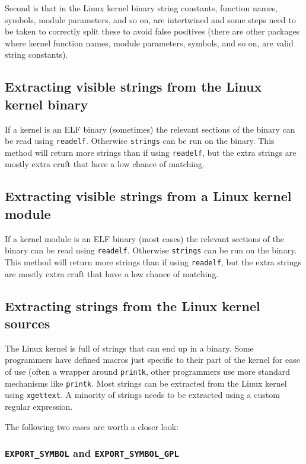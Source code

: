 \documentclass[10pt]{article}
\begin{document}
Second is that in the Linux kernel binary string constants, function names,
symbols, module parameters, and so on, are intertwined and some steps need to
be taken to correctly split these to avoid false positives (there are other
packages where kernel function names, module parameters, symbols, and so on,
are valid string constants).

\subsection{Extracting visible strings from the Linux kernel binary}

If a kernel is an ELF binary (sometimes) the relevant sections of the
binary can be read using \texttt{readelf}. Otherwise \texttt{strings} can be
run on the binary. This method will return more strings than if using
\texttt{readelf}, but the extra strings are mostly extra cruft that have a low
chance of matching.

\subsection{Extracting visible strings from a Linux kernel module}

If a kernel module is an ELF binary (most cases) the relevant sections of the
binary can be read using \texttt{readelf}. Otherwise \texttt{strings} can be
run on the binary. This method will return more strings than if using
\texttt{readelf}, but the extra strings are mostly extra cruft that have a low
chance of matching.

\subsection{Extracting strings from the Linux kernel sources}

The Linux kernel is full of strings that can end up in a binary. Some
programmers have defined macros just specific to their part of the kernel for
ease of use (often a wrapper around \texttt{printk}, other programmers use
more standard mechanisms like \texttt{printk}. Most strings can be extracted
from the Linux kernel using \texttt{xgettext}. A minority of strings needs to
be extracted using a custom regular expression.

The following two cases are worth a closer look:

\subsubsection{\texttt{EXPORT\_SYMBOL} and \texttt{EXPORT\_SYMBOL\_GPL}}
\end{document}

